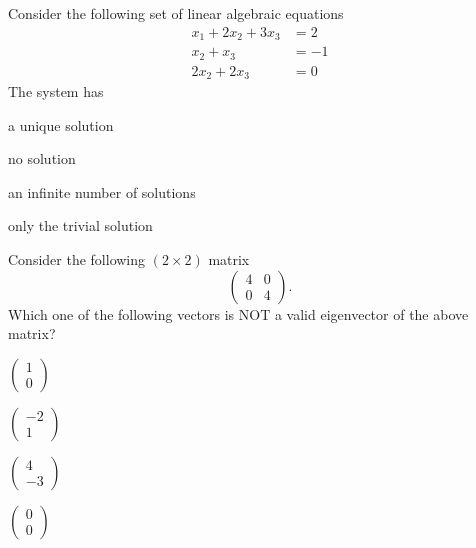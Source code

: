 \item Consider the following set of linear algebraic equations
\begin{align*}x_1 + 2x_2 + 3x_3 &= 2 \\x_2 + x_3 &= -1 \\2x_2 + 2x_3 &= 0\end{align*}
The system has
\hfill{}
\begin{enumerate}
\begin{multicols}{2}
\item a unique solution
\item no solution
\item an infinite number of solutions
\item only the trivial solution
\end{multicols}
\end{enumerate}

\item Consider the following $(2\times 2)$ matrix
\[\begin{pmatrix}4 & 0 \\0 & 4\end{pmatrix}.\]
Which one of the following vectors is NOT a valid eigenvector of the above matrix?

\hfill{}
\begin{enumerate}
\begin{multicols}{4}
\item $\begin{pmatrix} 1 \\ 0 \end{pmatrix}$
\item $\begin{pmatrix} -2 \\ 1 \end{pmatrix}$ \\
\item $\begin{pmatrix} 4 \\ -3 \end{pmatrix}$
\item $\begin{pmatrix} 0 \\ 0 \end{pmatrix}$
\end{multicols}
\end{enumerate}

